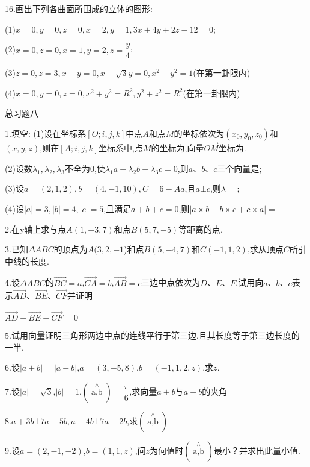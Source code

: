 \documentclass[oneside]{book}
\begin{document}
16.画出下列各曲面所围成的立体的图形:

(1)$x = 0,y = 0,z = 0,x = 2,y = 1,3x + 4y + 2z - 12 = 0$;

(2)$x = 0,z = 0,x = 1,y = 2,z = \dfrac{y}{4}$;

(3)$z = 0,z = 3,x - y = 0,x - \sqrt 3 y = 0,{x^2} + {y^2} = 1$(在第一卦限内)

(4)$x = 0,y = 0,z = 0,{x^2} + {y^2} = {R^2},{y^2} + {z^2} = {R^2}$(在第一卦限内)

总习题八

1.填空:
(1)设在坐标系$[O;i,j,k]$中点$A$和点$M$的坐标依次为$\left( {{x_0},{y_0},{z_0}} \right)$和$(x,y,z)$,则在$[A;i,j,k]$坐标系中,点$M$的坐标为\underline{\quad \quad },向量$\overrightarrow {OM} $坐标为\underline{\quad \quad \quad \quad }.

(2)设数${\lambda _1},{\lambda _2},{\lambda _3}$不全为0,使${\lambda _1}a + {\lambda _2}b + {\lambda _3}c = 0$,则$a$、$b$、$c$三个向量是\underline{\quad \quad };

(3)设$a=(2,1,2),b=(4,-1,10),C=6-Aa$,且$a \bot c$,则$\lambda  = $\underline{\quad };

(4)设$\left| a \right| = 3,\left| b \right| = 4,\left| c \right| = 5$,且满足$a + b + c = 0$,则$|a \times b + b \times c + c \times a| = $

2.在y轴上求与点$A(1,-3,7)$和点$B(5,7,-5)$等距离的点.

3.已知$\Delta ABC$的顶点为$A(3,2,-1$)和点$B(5,-4,7)$和$C(-1,1,2)$,求从顶点$C$所引中线的长度.

4.设$\Delta ABC$的$\overrightarrow {BC}  = a$,$\overrightarrow {CA}  = b$,$\overrightarrow {AB}  = c$三边中点依次为$D$、$E$、$F$,试用向$a$、$b$、$c$表示$\overrightarrow {AD} $、$\overrightarrow {BE} $、$\overrightarrow {CF} $并证明

$\overrightarrow {AD}  + \overrightarrow {BE}  + \overrightarrow {CF}  = 0$

5.试用向量证明三角形两边中点的连线平行于第三边,且其长度等于第三边长度的一半.

6.设$|a + b\left|  =  \right|a - b|$,$a = (3, - 5,8)$,$b = ( - 1,1,2,z)$,求$z$.

7.设$\left| a \right| = \sqrt 3 $,$|b| = 1$,$(\mathop {a,b}\limits^ \wedge  ) = \dfrac{\pi }{6}$,求向量$a+b$与$a-b$的夹角

8.$a + 3b \bot 7a - 5b,a - 4b \bot 7a - 2b$,求$(\mathop {a,b}\limits^ \wedge  )$

9.设$a = \left( {2, - 1, - 2} \right)$,$b = (1,1,z)$,问$z$为何值时$(\mathop {a,b}\limits^ \wedge  )$最小？并求出此量小值.
\end{document}
